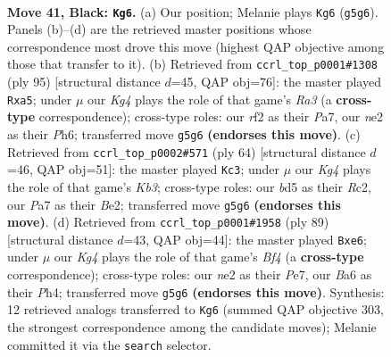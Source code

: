 \documentclass[11pt]{article}
\begin{document}
\clearpage

\begin{figure}[p]\centering
\begin{subfigure}{0.46\textwidth}\centering
\resizebox{\linewidth}{!}{%
\newchessgame
\chessboard[
  setfen={8/p3r3/br1p4/2pB2k1/2P3P1/7K/4NR2/R7 b - - 2 41},
  showmover=false,
  pgfstyle=straightmove, color=movearrow, markmove={g5-g6}
]}
\caption{}
\end{subfigure}\hfill
\begin{subfigure}{0.46\textwidth}\centering
\resizebox{\linewidth}{!}{%
\newchessgame
\chessboard[
  setfen={8/pp5k/r6p/P3b3/7P/3N1RP1/7K/8 b - - 3 48},
  showmover=false,
  pgfstyle=straightmove, color=movearrow, markmove={a6-a5}
]}
\caption{}
\end{subfigure}
\\[4pt]
\begin{subfigure}{0.46\textwidth}\centering
\resizebox{\linewidth}{!}{%
\newchessgame
\chessboard[
  setfen={5k2/5p1p/4b3/pR6/2Pr4/1K6/2R1B1PP/r7 w - - 6 33},
  showmover=false,
  pgfstyle=straightmove, color=movearrow, markmove={b3-c3}
]}
\caption{}
\end{subfigure}\hfill
\begin{subfigure}{0.46\textwidth}\centering
\resizebox{\linewidth}{!}{%
\newchessgame
\chessboard[
  setfen={1r6/3Rp3/P3Pk2/1p1B1b1p/7p/8/7K/8 b - - 0 45},
  showmover=false,
  pgfstyle=straightmove, color=movearrow, markmove={f5-e6}
]}
\caption{}
\end{subfigure}
\caption{\textbf{Move 41, Black: \texttt{Kg6}.} (a) Our position; Melanie plays \texttt{Kg6} (\texttt{g5g6}). Panels (b)--(d) are the retrieved master positions whose correspondence most drove this move (highest QAP objective among those that transfer to it). (b) Retrieved from \texttt{ccrl\_top\_p0001\#1308} (ply 95) [structural distance $d$=45, QAP obj=76]: the master played \texttt{Rxa5}; under $\mu$ our \emph{Kg4} plays the role of that game's \emph{Ra3} (a \textbf{cross-type} correspondence); cross-type roles: our \emph{r}f2 as their \emph{P}a7, our \emph{n}e2 as their \emph{P}h6; transferred move \texttt{g5g6} \textbf{(endorses this move)}. (c) Retrieved from \texttt{ccrl\_top\_p0002\#571} (ply 64) [structural distance $d$=46, QAP obj=51]: the master played \texttt{Kc3}; under $\mu$ our \emph{Kg4} plays the role of that game's \emph{Kb3}; cross-type roles: our \emph{b}d5 as their \emph{R}c2, our \emph{P}a7 as their \emph{B}e2; transferred move \texttt{g5g6} \textbf{(endorses this move)}. (d) Retrieved from \texttt{ccrl\_top\_p0001\#1958} (ply 89) [structural distance $d$=43, QAP obj=44]: the master played \texttt{Bxe6}; under $\mu$ our \emph{Kg4} plays the role of that game's \emph{Bf4} (a \textbf{cross-type} correspondence); cross-type roles: our \emph{n}e2 as their \emph{P}e7, our \emph{B}a6 as their \emph{P}h4; transferred move \texttt{g5g6} \textbf{(endorses this move)}. Synthesis: 12 retrieved analogs transferred to \texttt{Kg6} (summed QAP objective 303, the strongest correspondence among the candidate moves); Melanie committed it via the \texttt{search} selector.}
\label{fig:thought-m81}
\end{figure}
\end{document}
